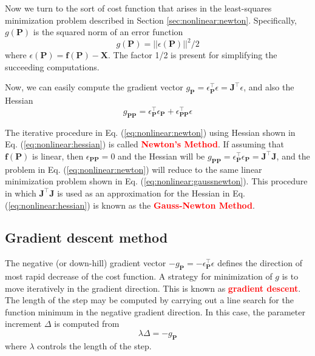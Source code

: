 \documentclass[12pt]{article}
\numberwithin{equation}{section}
\begin{document}
Now we turn to the sort of cost function that arises in the least-squares minimization problem described in Section \ref{sec:nonlinear:newton}. Specifically, $g(\mathbf{P})$ is the squared norm of an error function
\begin{equation*}
g(\mathbf{P}) = ||\epsilon(\mathbf{P})||^2 / 2
\end{equation*}
where $\epsilon(\mathbf{P}) = \mathbf{f(P) - X}$. The factor 1/2 is present for simplifying the succeeding computations.

Now, we can easily compute the gradient vector $g_{\mathbf{P}} = \epsilon_{\mathbf{P}}^\top \epsilon = \mathbf{J}^\top\epsilon$, and also the Hessian
\begin{equation}
g_{\mathbf{PP}} = \epsilon_{\mathbf{P}}^\top \epsilon_{\mathbf{P}} + \epsilon_{\mathbf{PP}}^\top \epsilon
\label{eq:nonlinear:hessian}
\end{equation}

The iterative procedure in Eq. (\ref{eq:nonlinear:newton}) using Hessian shown in Eq. (\ref{eq:nonlinear:hessian}) is called \textcolor{red}{\textbf{Newton's Method}}. If assuming that $\mathbf{f(P)}$ is linear, then $\epsilon_{\mathbf{PP}} = 0$ and the Hessian will be $g_{\mathbf{PP}} = \epsilon_{\mathbf{P}}^\top \epsilon_{\mathbf{P}} = \mathbf{J}^\top \mathbf{J}$, and the problem in Eq. (\ref{eq:nonlinear:newton}) will reduce to the same linear minimization problem shown in Eq. (\ref{eq:nonlinear:gaussnewton}). This procedure in which $\mathbf{J}^\top \mathbf{J}$ is used as an approximation for the Hessian in Eq. (\ref{eq:nonlinear:hessian}) is known as the \textcolor{red}{\textbf{Gauss-Newton Method}}.

\subsection{Gradient descent method}

The negative (or down-hill) gradient vector $-g_{\mathbf{P}} = -\epsilon_{\mathbf{P}}^\top \epsilon$ defines the direction of most rapid decrease of the cost function. A strategy for minimization of $g$ is to move iteratively in the gradient direction. This is known as  \textcolor{red}{\textbf{gradient descent}}. The length of the step may be computed by carrying out a line search for the function minimum in the negative gradient direction. In this case, the parameter increment $\Delta$ is computed from
\begin{equation}
\lambda \Delta = -g_{\mathbf{P}}
\end{equation}
where $\lambda$ controls the length of the step.
\end{document}
